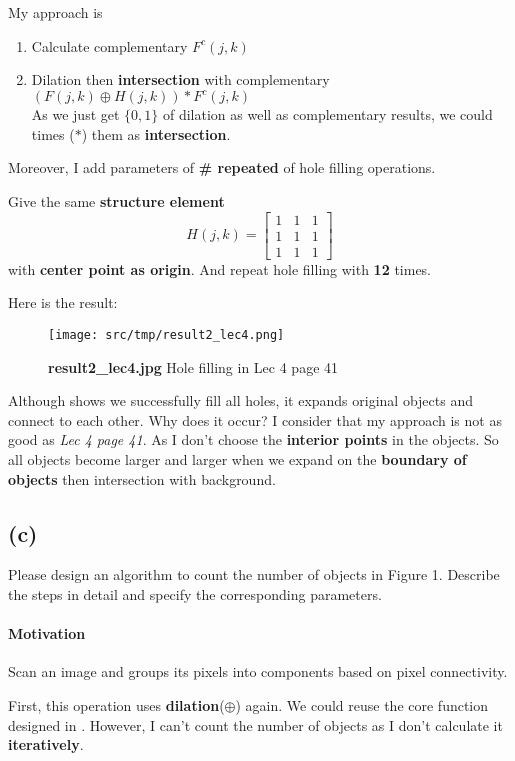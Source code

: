 My approach is
\begin{enumerate}
    \item Calculate complementary \(F^{c}(j, k)\)
    \item Dilation then \textbf{intersection} with complementary \( (F(j, k) \oplus H(j, k)) \ast F^{c}(j, k) \) \\
	As we just get \(\{0, 1 \}\) of dilation as well as complementary results, we could times (\(\ast\)) them as \textbf{intersection}.
\end{enumerate}
Moreover, I add parameters of \textbf{\# repeated} of hole filling operations.

Give the same \textbf{structure element}
\[
    H(j, k) = \begin{bmatrix}
	1 & 1 & 1\\
	1 & 1 & 1\\
	1 & 1 & 1
    \end{bmatrix}
\]
with \textbf{center point as origin}. And repeat hole filling with \textbf{12} times.

Here is the result: 
\begin{figure}
    \centering
    \texttt{[image: src/tmp/result2\_lec4.png]}
    \caption{\textbf{result2\_lec4.jpg} Hole filling in Lec 4 page 41}
    \label{result2_lec4}
\end{figure}

Although  shows we successfully fill all holes, it expands original objects and connect to each other. 
Why does it occur? I consider that my approach is not as good as \textit{Lec 4 page 41}. As I don't choose the \textbf{interior points} in the objects. So all objects become larger and larger when we expand on the \textbf{boundary of objects} then intersection with background.

\subsection{(c)}\label{1_c}
Please design an algorithm to count the number of objects in Figure 1. Describe the steps in detail and specify the corresponding parameters.

\paragraph{Motivation}
Scan an image and groups its pixels into components based on pixel connectivity.

First, this operation uses \textbf{dilation}(\(\oplus \)) again. We could reuse the core function designed in . However, I can't count the number of objects as I don't calculate it \textbf{iteratively}.

